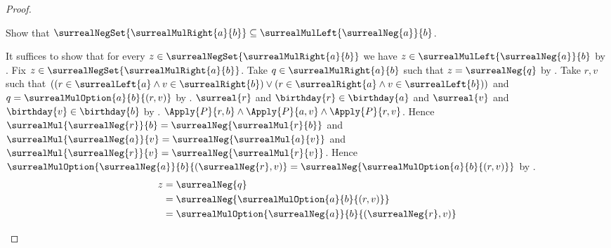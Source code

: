 \begin{proof}
\begin{subproof}
        Show that $\surrealNegSet{\surrealMulRight{a}{b}}
            \subseteq\surrealMulLeft{\surrealNeg{a}}{b}$.
        \begin{subproof}
            It suffices to show that for every
                $z\in\surrealNegSet{\surrealMulRight{a}{b}}$ we have
                $z\in\surrealMulLeft{\surrealNeg{a}}{b}$
                by .
            Fix $z\in\surrealNegSet{\surrealMulRight{a}{b}}$.
            Take $q\in\surrealMulRight{a}{b}$ such that
                $z=\surrealNeg{q}$
                by .
            Take $r,v$ such that
                $((r\in\surrealLeft{a}\land v\in\surrealRight{b})
                  \lor(r\in\surrealRight{a}\land v\in\surrealLeft{b}))$
                and $q=\surrealMulOption{a}{b}{(r,v)}$
                by .
            $\surreal{r}$ and $\birthday{r}\in\birthday{a}$ and
                $\surreal{v}$ and $\birthday{v}\in\birthday{b}$
                by .
            $\Apply{P}{r,b}\land
                \Apply{P}{a,v}\land
                \Apply{P}{r,v}$.
            Hence
                $\surrealMul{\surrealNeg{r}}{b}
                    =\surrealNeg{\surrealMul{r}{b}}$ and
                $\surrealMul{\surrealNeg{a}}{v}
                    =\surrealNeg{\surrealMul{a}{v}}$ and
                $\surrealMul{\surrealNeg{r}}{v}
                    =\surrealNeg{\surrealMul{r}{v}}$.
            Hence
                $\surrealMulOption{\surrealNeg{a}}{b}
                    {(\surrealNeg{r},v)}
                =\surrealNeg{\surrealMulOption{a}{b}{(r,v)}}$
                by .
            \begin{align*}
                z
                    &= \surrealNeg{q}
                    \\
                    &= \surrealNeg{\surrealMulOption{a}{b}{(r,v)}}
                    \\
                    &= \surrealMulOption{\surrealNeg{a}}{b}
                        {(\surrealNeg{r},v)}
            \end{align*}
\end{subproof}
\end{subproof}
\end{proof}
